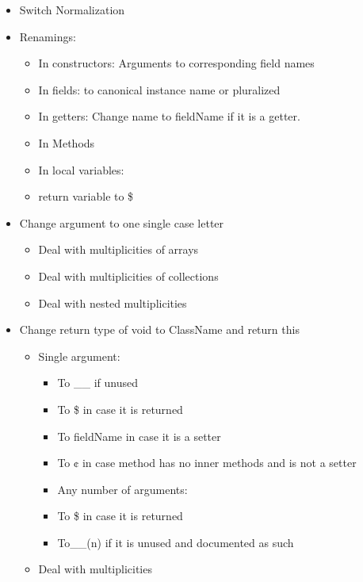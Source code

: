 \begin{itemize}
\item Switch Normalization
\item Renamings:
\begin{itemize}
  \item In constructors: Arguments to corresponding field names
  \item In fields: to canonical instance name or pluralized
  \item In getters: Change name to fieldName if it is a getter.
  \item In Methods
  \item In local variables:
  \item return variable to \$
\end{itemize}
\item Change argument to one single case letter
\begin{itemize}
  \item Deal with multiplicities of arrays
  \item Deal with multiplicities of collections
  \item Deal with nested multiplicities
\end{itemize}
\item Change return type of void to ClassName and return this
\begin{itemize}
  \item Single argument:
  \begin{itemize}
    \item To \_\_ if unused
    \item To \$ in case it is returned
    \item To fieldName in case it is a setter
    \item To ¢ in case method has no inner methods and is not a setter
   \end{itemize}
  \begin{itemize}
    \item Any number of arguments:
    \item To \$ in case it is returned
    \item To__(n) if it is unused and documented as such
   \end{itemize}
  \item Deal with multiplicities
\end{itemize}
\end{itemize}


